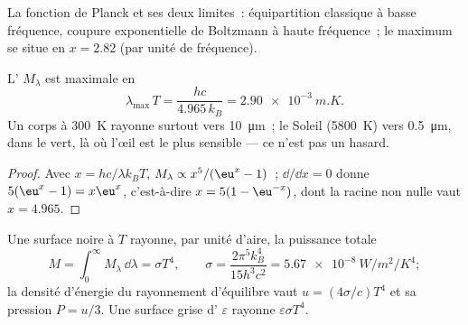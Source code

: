 \begin{omfigure}

{\small La fonction de Planck et ses deux limites~: équipartition classique
à basse fréquence, coupure exponentielle de Boltzmann à haute fréquence~;
le maximum se situe en $x = 2.82$ (par unité de fréquence).}
\end{omfigure}

\begin{proposition}\label{prop:b2:thermal-radiation:wien}
L' $M_\lambda$ est maximale en
\[
\lambda_{\max}\,T = \frac{hc}{4.965\,k_B} = \qty{2.90e-3}{m.K} .
\]
Un corps à \qty{300}{K} rayonne surtout vers \qty{10}{\micro m}~; le Soleil
(\qty{5800}{K}) vers \qty{0.5}{\micro m}, dans le vert, là où l'œil est le
plus sensible --- ce n'est pas un hasard.
\end{proposition}

\begin{proof}
Avec $x = hc/\lambda k_BT$, $M_\lambda \propto x^5/(\eu^x - 1)$~; $\dd/\dd x = 0$
donne $5(\eu^x - 1) = x\eu^x$, c'est-à-dire $x = 5(1 - \eu^{-x})$, dont la racine
non nulle vaut $x = 4.965$.
\end{proof}

\begin{theorem}\label{thm:b2:thermal-radiation:stefan}
Une surface noire à $T$ rayonne, par unité d'aire, la puissance totale
\[
M = \int_0^\infty M_\lambda\,\dd\lambda = \sigma T^4, \qquad
\sigma = \frac{2\pi^5k_B^4}{15h^3c^2} = \qty{5.67e-8}{W/m^2/K^4} ;
\]
la densité d'énergie du rayonnement d'équilibre vaut $u = (4\sigma/c)T^4$
et sa pression $P = u/3$. Une surface grise d' $\varepsilon$
rayonne $\varepsilon\sigma T^4$.
\end{theorem}

